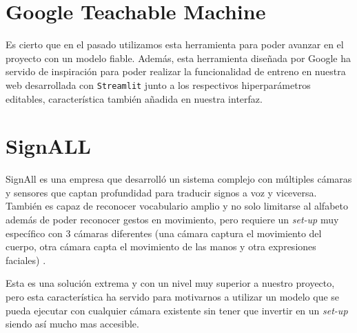 \section{Google Teachable Machine}
Es cierto que en el pasado utilizamos esta herramienta para poder avanzar en el proyecto con un modelo fiable. Además, esta herramienta diseñada por Google ha servido de inspiración para poder realizar la funcionalidad de entreno en nuestra web desarrollada con \texttt{Streamlit} junto a los respectivos hiperparámetros editables, característica también añadida en nuestra interfaz.


\section{SignALL}
SignAll es una empresa que desarrolló un sistema complejo con múltiples cámaras y sensores que captan profundidad para traducir signos a voz y viceversa. También es capaz de reconocer vocabulario amplio y no solo limitarse al alfabeto además de poder reconocer gestos en movimiento, pero requiere un \textit{set-up} muy específico con 3 cámaras diferentes (una cámara captura el movimiento del cuerpo, otra cámara capta el movimiento de las manos y otra expresiones faciales) \cite{web:signall}.

Esta es una solución extrema y con un nivel muy superior a nuestro proyecto, pero esta característica ha servido para motivarnos a utilizar un modelo que se pueda ejecutar con cualquier cámara existente sin tener que invertir en un \textit{set-up} siendo así mucho mas accesible.




